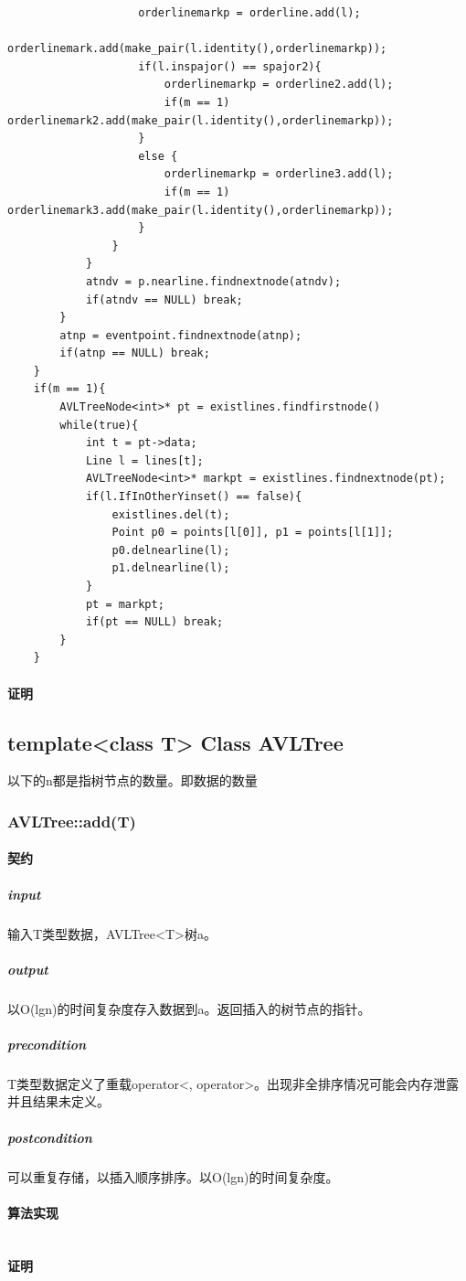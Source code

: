 \documentclass[a4paper]{book}
\numberwithin{equation}{chapter}
\theoremstyle{definition}
\begin{document}
\begin{lstlisting}
					orderlinemarkp = orderline.add(l);
					orderlinemark.add(make_pair(l.identity(),orderlinemarkp));
					if(l.inspajor() == spajor2){
						orderlinemarkp = orderline2.add(l);
						if(m == 1) orderlinemark2.add(make_pair(l.identity(),orderlinemarkp));
					}
					else {
						orderlinemarkp = orderline3.add(l);
						if(m == 1) orderlinemark3.add(make_pair(l.identity(),orderlinemarkp));
					}
				}
			}	
			atndv = p.nearline.findnextnode(atndv);	
			if(atndv == NULL) break;
		}
		atnp = eventpoint.findnextnode(atnp);
		if(atnp == NULL) break;
	}
	if(m == 1){
		AVLTreeNode<int>* pt = existlines.findfirstnode()
		while(true){
			int t = pt->data;
			Line l = lines[t];
			AVLTreeNode<int>* markpt = existlines.findnextnode(pt);
			if(l.IfInOtherYinset() == false){
				existlines.del(t);
				Point p0 = points[l[0]], p1 = points[l[1]];
				p0.delnearline(l);
				p1.delnearline(l);
			}
			pt = markpt;
			if(pt == NULL) break;
		}
	}
\end{lstlisting}
\paragraph{证明}


\subsection{template<class T> Class AVLTree}
以下的n都是指树节点的数量。即数据的数量
\subsubsection{AVLTree::add(T)}
\paragraph{契约}
\subparagraph{input}
输入T类型数据，AVLTree<T>树a。
\subparagraph{output}
以O(lgn)的时间复杂度存入数据到a。返回插入的树节点的指针。
\subparagraph{precondition}
T类型数据定义了重载operator<, operator>。出现非全排序情况可能会内存泄露并且结果未定义。
\subparagraph{postcondition}
可以重复存储，以插入顺序排序。以O(lgn)的时间复杂度。
\paragraph{算法实现}
\begin{lstlisting}
\end{lstlisting}
\paragraph{证明}
\end{document}
